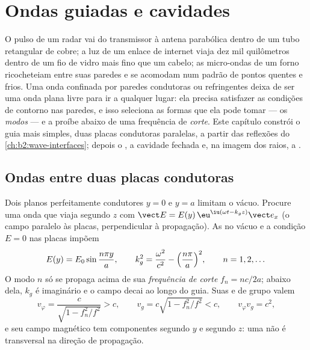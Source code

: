 \chapter{Ondas guiadas e cavidades}\label{ch:b2:guided-waves}

O pulso de um radar vai do transmissor à antena parabólica dentro de um
tubo retangular de cobre; a luz de um enlace de internet viaja dez
mil quilômetros dentro de um fio de vidro mais fino que um cabelo; as
micro-ondas de um forno ricocheteiam entre suas paredes e se acomodam num
padrão de pontos quentes e frios. Uma onda confinada por paredes condutoras ou
refringentes deixa de ser uma onda plana livre para ir a qualquer lugar: ela
precisa satisfazer as condições de contorno nas paredes, e isso seleciona
as formas que ela pode tomar --- os \emph{modos} --- e a proíbe abaixo de uma
frequência de \emph{corte}. Este capítulo constrói o guia mais simples, duas
placas condutoras paralelas, a partir das reflexões do
\cref{ch:b2:wave-interfaces}; depois o , a
cavidade fechada e, na imagem dos raios, a .

\section{Ondas entre duas placas condutoras}

\begin{proposition}\label{prop:b2:guided-waves:plates}
Dois planos perfeitamente condutores $y = 0$ e $y = a$ limitam o vácuo.
Procure uma onda que viaja segundo $z$ com $\vect E = E(y)\,\eu^{\iu(\omega t - k_gz)}
\vect e_x$ (o campo paralelo às placas, perpendicular à
propagação). As  no vácuo e a condição $E = 0$
nas placas impõem
\[
E(y) = E_0\sin\frac{n\pi y}a , \qquad
k_g^2 = \frac{\omega^2}{c^2} - \Bigl(\frac{n\pi}a\Bigr)^2 , \qquad n = 1, 2, \dots
\]
O modo $n$ só se propaga acima de sua \emph{frequência de corte} $f_n = nc/2a$;
abaixo dela, $k_g$ é imaginário e o campo decai ao longo do guia. Suas
 e de grupo valem
\[
v_\varphi = \frac c{\sqrt{1 - f_n^2/f^2}} > c , \qquad
v_g = c\sqrt{1 - f_n^2/f^2} < c , \qquad v_\varphi v_g = c^2 ,
\]
e seu campo magnético tem componentes segundo $y$ e segundo $z$: uma
 não é transversal na direção de propagação.
\end{proposition}


